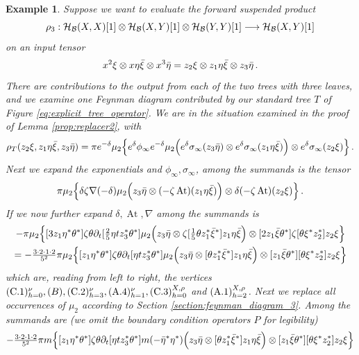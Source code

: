 \documentclass[english,letter paper,12pt,leqno]{article}
\theoremstyle{example}
\newtheorem{example}[theorem]{Example}
\numberwithin{equation}{section}
\def\BB{\mathcal{B}}
\def\HH{\HH}
\def\HH{\mathcal{H}}
\DeclareMathOperator{\vAt}{At}
\begin{document}
\begin{example}
Suppose we want to evaluate the forward suspended product
\[
\rho_3: \HH_{\BB}(X,X)[1] \otimes \HH_{\BB}(X,Y)[1] \otimes \HH_{\BB}(Y,Y)[1] \lto \HH_{\BB}(X,Y)[1]
\]
on an input tensor
\[
x^2 \xi \otimes x \eta \Bar{\xi} \otimes x^3 \Bar{\eta} = z_2 \xi \otimes z_1 \eta \Bar{\xi} \otimes z_3 \Bar{\eta}\,.
\]
There are contributions to the output from each of the two trees with three leaves, and we examine one Feynman diagram contributed by our standard tree $T$ of Figure \ref{eq:explicit_tree_operator}. We are in the situation examined in the proof of Lemma \ref{prop:replacer2}, with
\[
\rho_T( z_2 \xi, z_1 \eta \Bar{\xi}, z_3 \Bar{\eta} ) = \pi e^{-\delta} \mu_2\Big\{ e^{\delta} \phi_\infty e^{-\delta} \mu_2\Big( e^\delta \sigma_\infty( z_3 \Bar{\eta} ) \otimes e^\delta \sigma_\infty( z_1 \eta \Bar{\xi} ) \Big) \otimes e^\delta\sigma_\infty( z_2 \xi ) \Big\}\,.
\]
Next we expand the exponentials and $\phi_\infty, \sigma_\infty$, among the summands is the tensor
\begin{align*}
\pi \mu_2\Big\{ \delta \zeta \nabla (-\delta) \mu_2\Big( z_3 \Bar{\eta} \otimes (-\zeta \vAt)( z_1\eta \Bar{\xi} ) \Big) \otimes \delta (-\zeta \vAt)( z_2 \xi ) \Big\}\,.
\end{align*}
If we now further expand $\delta, \vAt, \nabla$ among the summands is
\begin{gather*}
- \pi \mu_2\Big\{ [ 3 z_1 \eta^* \theta^* ] \zeta \theta \partial_t [ \tfrac{2}{5} \eta t z_3^* \theta^* ] \mu_2\Big( z_3 \Bar{\eta} \otimes \zeta [\tfrac{1}{5} \theta z_1^* \Bar{\xi}^*] z_1 \eta \Bar{\xi}\Big) \otimes [2z_1 \Bar{\xi} \theta^*] \zeta [\theta \xi^* z_2^*] z_2 \xi \Big\}\\
= - \tfrac{3 \cdot 2 \cdot 1 \cdot 2}{5^2} \pi \mu_2\Big\{ [ z_1 \eta^* \theta^* ] \zeta \theta \partial_t [ \eta t z_3^* \theta^* ] \mu_2\Big( z_3 \Bar{\eta} \otimes [ \theta z_1^* \Bar{\xi}^*] z_1 \eta \Bar{\xi}\Big) \otimes [z_1 \Bar{\xi} \theta^*] [\theta \xi^* z_2^*] z_2 \xi \Big\}
\end{gather*}
which are, reading from left to right, the vertices $(\textup{C}.1)^\nu_{h=0}, (B), (\textup{C}.2)^{\nu}_{h=3}, (\textup{A}.4)^\nu_{h=1}, (\textup{C}.3)^{X,\rho}_{h=0}$ and $(\textup{A}.1)^{X,\rho}_{h=2}$. Next we replace all occurrences of $\mu_2$ according to Section \ref{section:feynman_diagram_3}. Among the summands are (we omit the boundary condition operators $P$ for legibility)
\begin{gather*}
- \tfrac{3 \cdot 2 \cdot 1 \cdot 2}{5^2} \pi m\Big\{ [ z_1 \eta^* \theta^* ] \zeta \theta \partial_t [ \eta t z_3^* \theta^* ] m (- \Bar{\eta}^* \eta^*) \Big( z_3 \Bar{\eta} \otimes [ \theta z_1^* \Bar{\xi}^*] z_1 \eta \Bar{\xi}\Big) \otimes [z_1 \Bar{\xi} \theta^*] [\theta \xi^* z_2^*] z_2 \xi \Big\}\\

\end{gather*}
\end{example}
\end{document}
